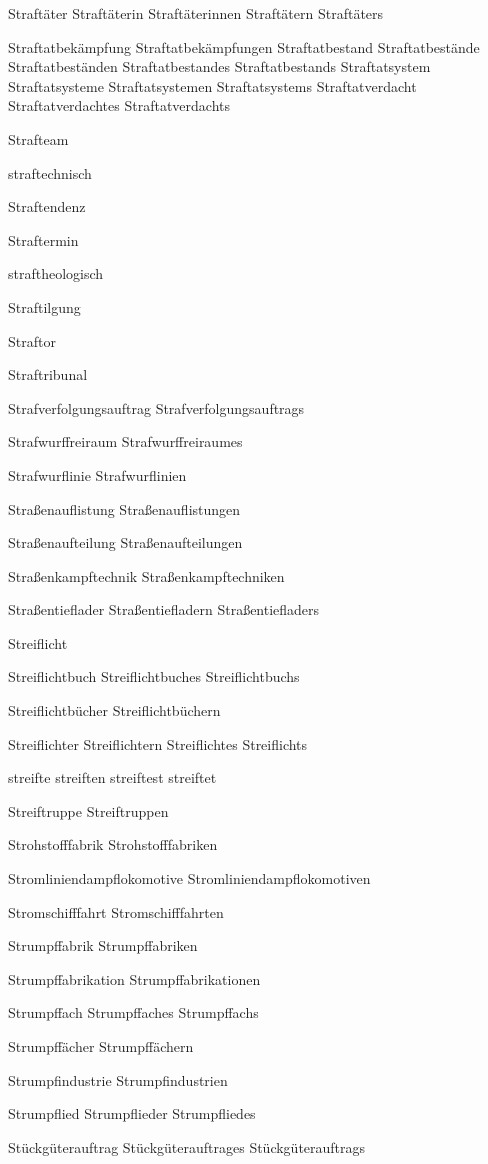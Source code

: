 Straftäter
Straftäterin
Straftäterinnen
Straftätern
Straftäters

Straftatbekämpfung
Straftatbekämpfungen
Straftatbestand
Straftatbestände
Straftatbeständen
Straftatbestandes
Straftatbestands
Straftatsystem
Straftatsysteme
Straftatsystemen
Straftatsystems
Straftatverdacht
Straftatverdachtes
Straftatverdachts

Strafteam

straftechnisch 

Straftendenz

Straftermin 

straftheologisch 

Straftilgung 

Straftor 

Straftribunal

Strafverfolgungsauftrag
Strafverfolgungsauftrags

Strafwurffreiraum
Strafwurffreiraumes

Strafwurflinie
Strafwurflinien

Straßenauflistung
Straßenauflistungen

Straßenaufteilung
Straßenaufteilungen

Straßenkampftechnik
Straßenkampftechniken

Straßentieflader
Straßentiefladern
Straßentiefladers

Streiflicht

Streiflichtbuch
Streiflichtbuches
Streiflichtbuchs

Streiflichtbücher
Streiflichtbüchern

Streiflichter
Streiflichtern
Streiflichtes
Streiflichts

streifte
streiften
streiftest
streiftet

Streiftruppe
Streiftruppen

Strohstofffabrik
Strohstofffabriken

Stromliniendampflokomotive
Stromliniendampflokomotiven

Stromschifffahrt
Stromschifffahrten

Strumpffabrik
Strumpffabriken

Strumpffabrikation
Strumpffabrikationen

Strumpffach
Strumpffaches
Strumpffachs

Strumpffächer
Strumpffächern

Strumpfindustrie
Strumpfindustrien

Strumpflied
Strumpflieder
Strumpfliedes

Stückgüterauftrag
Stückgüterauftrages
Stückgüterauftrags

